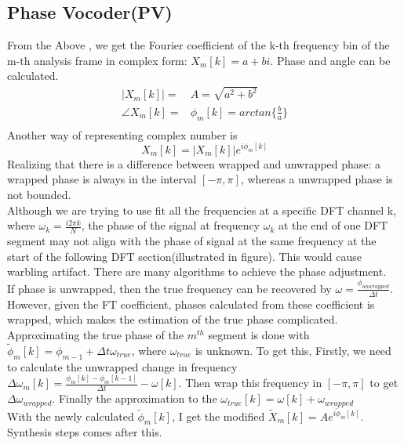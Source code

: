 \documentclass{article}
\begin{document}
\subsection{Phase Vocoder(PV)}
From the Above , we get the Fourier coefficient of the k-th frequency bin of the m-th analysis frame in complex form: $ X_{m}[k] = a + bi$. Phase and angle can be calculated. \\
\[
\begin{aligned}
        |X_{m}[k]|=&A= \sqrt{a^2+b^2}  \\
        \angle X_{m}[k]=&\phi_{m}[k]= arctan\{\frac{b}{a}\} \\
\end{aligned}
\]
Another way of representing complex number is 
\begin{equation}
        X_m[k] = |X_m[k]| e^{i\phi_{m}[k]}
\label{eq : }
\end{equation}
Realizing that there is a difference between wrapped and unwrapped phase: a wrapped phase is always in the interval $[-\pi, \pi]$, whereas a unwrapped phase is not bounded.\\
Although we are trying to use fit all the frequencies at a specific DFT channel k, where $\omega_k = \frac{i2\pi k}{N}$, the phase of the signal at frequency $\omega_k$ at the end of one DFT segment may not align with the phase of signal at the same frequency at the start of the following DFT section(illustrated in figure). This would cause warbling artifact. There are many algorithms to achieve the phase adjustment. \\
If phase is unwrapped, then the true frequency can be recovered by $\omega = \frac{\phi_{unwrapped}}{\Delta t} $. However, given the FT coefficient, phases calculated from these coefficient is wrapped, which makes the estimation of the true phase complicated. \\
Approximating the true phase of the $m^{th}$ segment is done with $\tilde{\phi}_m[k] = \phi_{m-1} + \Delta t \omega_{true}$, where $\omega_{true}$ is unknown. To get this, Firstly, we need to calculate the unwrapped change in frequency $\Delta\omega_m[k]= \frac{\phi_m[k] - \phi_m[k-1]}{\Delta t} - \omega[k]$. Then wrap this frequency in $[-\pi, \pi]$ to get $\Delta\omega_{wrapped}$. Finally the approximation to the  $\omega_{true}[k]=\omega[k]+\omega_{wrapped}$\\
With the newly calculated  $\tilde{\phi}_m[k]$, I get the modified $\tilde{X}_m[k] = Ae^{i\tilde{\phi}_m[k] }$. Synthesis steps comes after this.
\end{document}
